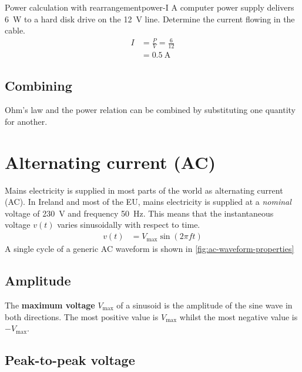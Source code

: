 \begin{example}{Power calculation with rearrangement}{power-I}
  A computer power supply delivers \SI{6}{\watt} to a hard disk drive on the \SI{12}{\volt} line.
  Determine the current flowing in the cable.
  \tcblower
  \begin{align}
     I & = \frac{P}{V} = \frac{6}{12} \\
      & = \SI{0.5}{\ampere}
  \end{align}
\end{example}

\subsection{Combining}
\label{sec:combining}

Ohm's law and the power relation can be combined by substituting one quantity for another.

\section{Alternating current (AC)}
\label{sec:alternating-current}

Mains electricity is supplied in most parts of the world as alternating current (AC).
In Ireland and most of the EU, mains electricity is supplied at a \textit{nominal} voltage of \SI{230}{\volt} and frequency \SI{50}{\hertz}.
This means that the instantaneous voltage $v(t)$ varies sinusoidally with respect to time.
\begin{align}
  v(t) & = V_{\mbox{max}} \sin ( 2 \pi f t ) \label{eq:ac-instantaneous-voltage}
\end{align}
A single cycle of a generic AC waveform is shown in \autoref{fig:ac-waveform-properties}


\subsection{Amplitude}
\label{sec:amplitude}

The \textbf{maximum voltage} $V_{\mbox{max}}$ of a sinusoid is the amplitude of the sine wave in both directions.
The most positive value is $V_{\mbox{max}}$ whilst the most negative value is $-V_{\mbox{max}}$.

\subsection{Peak-to-peak voltage}
\label{sec:peak-to-peak-voltage}

